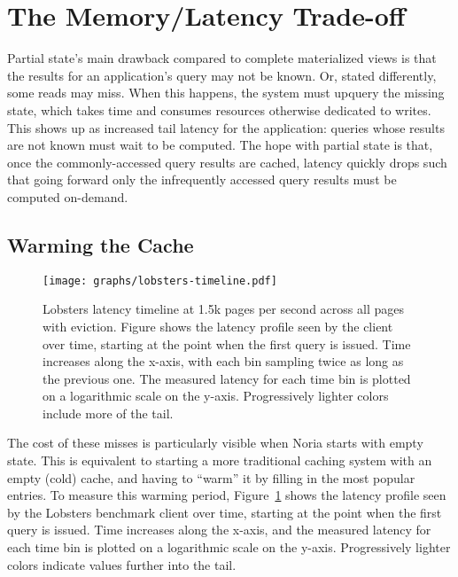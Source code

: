 
\section{The Memory/Latency Trade-off}
\label{s:eval:cost}

Partial state's main drawback compared to complete materialized views is
that the results for an application's query may not be known. Or, stated
differently, some reads may miss. When this happens, the system must upquery the
missing state, which takes time and consumes resources otherwise dedicated to
writes. This shows up as increased tail latency for the application: queries
whose results are not known must wait to be computed. The hope with partial
state is that, once the commonly-accessed query results are cached, latency
quickly drops such that going forward only the infrequently accessed query
results must be computed on-demand.

\subsection{Warming the Cache}

\begin{figure}[t]
  \centering
  \texttt{[image: graphs/lobsters-timeline.pdf]}
  \caption{Lobsters latency timeline at 1.5k pages per second across all pages
  with eviction. Figure shows the latency profile seen by the client over time,
  starting at the point when the first query is issued. Time increases along the
  x-axis, with each bin sampling twice as long as the previous one. The measured
  latency for each time bin is plotted on a logarithmic scale on the y-axis.
  Progressively lighter colors include more of the tail.}
  \label{f:lobsters-timeline}
\end{figure}

The cost of these misses is particularly visible when Noria starts with empty
state. This is equivalent to starting a more traditional caching system with an
empty (cold) cache, and having to ``warm'' it by filling in the most popular
entries. To measure this warming period, Figure~\ref{f:lobsters-timeline} shows
the latency profile seen by the Lobsters benchmark client over time, starting at
the point when the first query is issued. Time increases along the x-axis, and
the measured latency for each time bin is plotted on a logarithmic scale on the
y-axis. Progressively lighter colors indicate values further into the tail.

